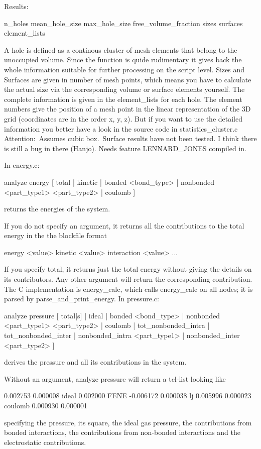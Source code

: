 {Results:\
\begin{tclcode}
 { n_holes mean_hole_size max_hole_size free_volume_fraction { sizes }
{ surfaces } { element_lists } } 
\end{tclcode}
A hole is defined as a continous cluster of mesh elements that belong to the unoccupied volume. Since the function is quide rudimentary it gives back the whole information suitable for further processing on the script level. Sizes and Surfaces are given in number of mesh points, which means you have to calculate the actual size via the corresponding volume or surface elements yourself. The complete information is given in the element\_lists for each hole. The element numbers give the position of a mesh point in the linear representation of the 3D grid (coordinates are in the order x, y, z). But if you want to use the detailed information you better have a look in the source code in statistics\_cluster.c
Attention:\ Assumes cubic box.\ Surface results have not been tested. I think there is still a bug in there (Hanjo). Needs feature LENNARD\_JONES compiled in.

In energy.c:
\begin{tclcode}
 analyze energy [{ total |
 kinetic | bonded <bond_type> | nonbonded <part_type1> <part_type2>
| coulomb }]
\end{tclcode}

returns the energies of the system.

If you do not specify an argument, it returns all the contributions to the total energy in the the blockfile format

\begin{tclcode}
{ energy <value> } { kinetic <value> } { interaction <value> } ... 
\end{tclcode}
If you specify total, it returns just the total energy without giving the details on its contributors. Any other argument will return the corresponding contribution.
The C implementation is energy\_calc, which calls energy\_calc on all nodes; it is parsed by parse\_and\_print\_energy.
In pressure.c:

\begin{tclcode}
 analyze pressure [{ total[s] | ideal | 
bonded <bond_type> | nonbonded <part_type1> <part_type2>
| coulomb | tot_nonbonded_intra | tot_nonbonded_inter | 
nonbonded_intra <part_type1> | nonbonded_inter <part_type2> }] 
\end{tclcode}
derives the pressure and all its contributions in the system.

Without an argument, analyze pressure will return a tcl-list looking like
\begin{tclcode}
 0.002753 0.000008 { ideal 0.002000 } { { FENE -0.006172 0.000038 } } 
 { lj 0.005996 0.000023 } { coulomb 0.000930 0.000001 }
\end{tclcode}
specifying the pressure, its square, the ideal gas pressure, the contributions from bonded interactions, the contributions from non-bonded interactions and the electrostatic contributions.


}
